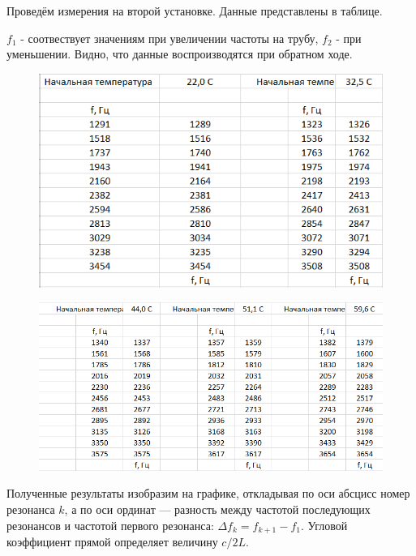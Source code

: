 \documentclass[a4paper, 12pt]{article} %
\begin{document}
        Проведём измерения на второй установке. Данные представлены в таблице.
        
        $f_1$ - соотвествует значениям при увеличении частоты на трубу, $f_2$ - при уменьшении. Видно, что данные воспроизводятся при обратном ходе.		

\begin{figure}
    \begin{center}
        \includegraphics[scale = 0.9]{1}
    \end{center}
\end{figure}

\begin{figure}
    \begin{center}
        \includegraphics[scale = 0.9]{2}
    \end{center}
\end{figure}
    
        Полученные результаты изобразим на графике, откладывая
        по оси абсцисс номер резонанса $k$, а по оси ординат — разность между частотой последующих резонансов и частотой первого резонанса: $\Delta f_k = f_{k+1}-f_1.$ Угловой
        коэффициент прямой определяет величину $c/2L$.
        
\end{document}
